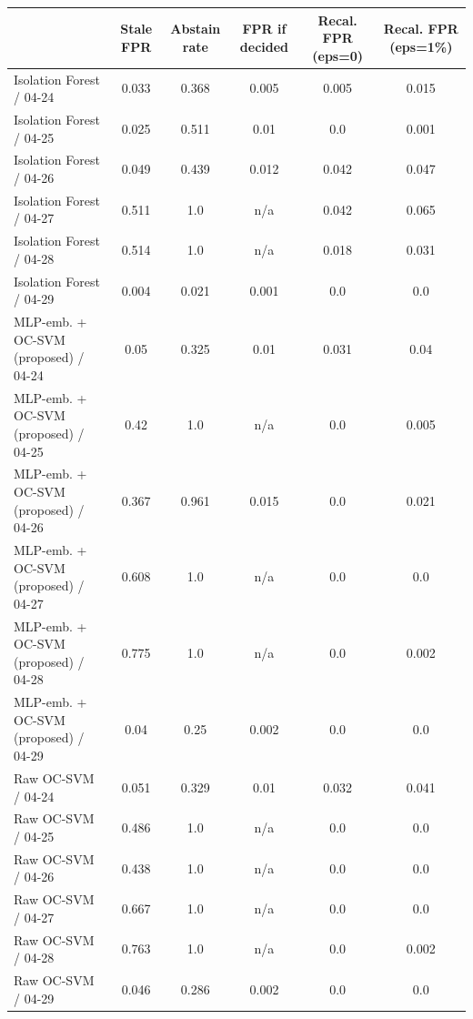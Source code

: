 \begin{tabular}{lccccc}
\toprule
 & Stale FPR & Abstain rate & FPR if decided & Recal. FPR (eps=0) & Recal. FPR (eps=1\%) \\
\midrule
Isolation Forest / 04-24 & 0.033 & 0.368 & 0.005 & 0.005 & 0.015 \\
Isolation Forest / 04-25 & 0.025 & 0.511 & 0.01 & 0.0 & 0.001 \\
Isolation Forest / 04-26 & 0.049 & 0.439 & 0.012 & 0.042 & 0.047 \\
Isolation Forest / 04-27 & 0.511 & 1.0 & n/a & 0.042 & 0.065 \\
Isolation Forest / 04-28 & 0.514 & 1.0 & n/a & 0.018 & 0.031 \\
Isolation Forest / 04-29 & 0.004 & 0.021 & 0.001 & 0.0 & 0.0 \\
MLP-emb. + OC-SVM (proposed) / 04-24 & 0.05 & 0.325 & 0.01 & 0.031 & 0.04 \\
MLP-emb. + OC-SVM (proposed) / 04-25 & 0.42 & 1.0 & n/a & 0.0 & 0.005 \\
MLP-emb. + OC-SVM (proposed) / 04-26 & 0.367 & 0.961 & 0.015 & 0.0 & 0.021 \\
MLP-emb. + OC-SVM (proposed) / 04-27 & 0.608 & 1.0 & n/a & 0.0 & 0.0 \\
MLP-emb. + OC-SVM (proposed) / 04-28 & 0.775 & 1.0 & n/a & 0.0 & 0.002 \\
MLP-emb. + OC-SVM (proposed) / 04-29 & 0.04 & 0.25 & 0.002 & 0.0 & 0.0 \\
Raw OC-SVM / 04-24 & 0.051 & 0.329 & 0.01 & 0.032 & 0.041 \\
Raw OC-SVM / 04-25 & 0.486 & 1.0 & n/a & 0.0 & 0.0 \\
Raw OC-SVM / 04-26 & 0.438 & 1.0 & n/a & 0.0 & 0.0 \\
Raw OC-SVM / 04-27 & 0.667 & 1.0 & n/a & 0.0 & 0.0 \\
Raw OC-SVM / 04-28 & 0.763 & 1.0 & n/a & 0.0 & 0.002 \\
Raw OC-SVM / 04-29 & 0.046 & 0.286 & 0.002 & 0.0 & 0.0 \\
\bottomrule
\end{tabular}